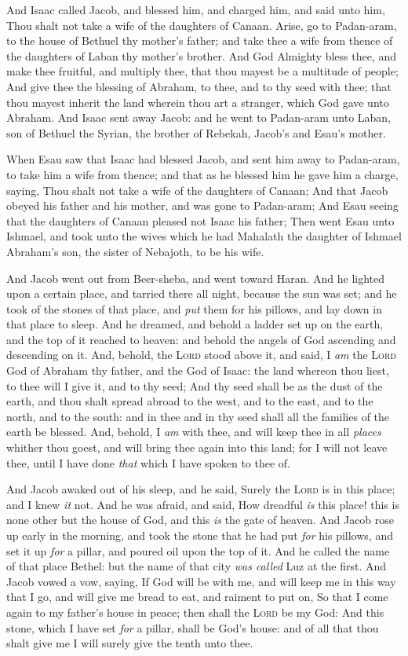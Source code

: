 \documentclass[11pt,letterpaper,oneside]{memoir}
\begin{document}
And Isaac called Jacob, and blessed him, and charged him, and said unto
him, Thou shalt not take a wife of the daughters of Canaan. Arise, go to
Padan-aram, to the house of Bethuel thy mother's father; and take thee a
wife from thence of the daughters of Laban thy mother's brother. And God
Almighty bless thee, and make thee fruitful, and multiply thee, that
thou mayest be a multitude of people; And give thee the blessing of
Abraham, to thee, and to thy seed with thee; that thou mayest inherit
the land wherein thou art a stranger, which God gave unto Abraham. And
Isaac sent away Jacob: and he went to Padan-aram unto Laban, son of
Bethuel the Syrian, the brother of Rebekah, Jacob's and Esau's mother.

When Esau saw that Isaac had blessed Jacob, and sent him away to
Padan-aram, to take him a wife from thence; and that as he blessed him
he gave him a charge, saying, Thou shalt not take a wife of the
daughters of Canaan; And that Jacob obeyed his father and his mother,
and was gone to Padan-aram; And Esau seeing that the daughters of Canaan
pleased not Isaac his father; Then went Esau unto Ishmael, and took unto
the wives which he had Mahalath the daughter of Ishmael Abraham's son,
the sister of Nebajoth, to be his wife.

And Jacob went out from Beer-sheba, and went toward Haran. And he
lighted upon a certain place, and tarried there all night, because the
sun was set; and he took of the stones of that place, and \emph{put}
them for his pillows, and lay down in that place to sleep. And he
dreamed, and behold a ladder set up on the earth, and the top of it
reached to heaven: and behold the angels of God ascending and descending
on it. And, behold, the \textsc{Lord} stood above it, and said, I
\emph{am} the \textsc{Lord} God of Abraham thy father, and the God of
Isaac: the land whereon thou liest, to thee will I give it, and to thy
seed; And thy seed shall be as the dust of the earth, and thou shalt
spread abroad to the west, and to the east, and to the north, and to the
south: and in thee and in thy seed shall all the families of the earth
be blessed. And, behold, I \emph{am} with thee, and will keep thee in
all \emph{places} whither thou goest, and will bring thee again into
this land; for I will not leave thee, until I have done \emph{that}
which I have spoken to thee of.

And Jacob awaked out of his sleep, and he said, Surely the \textsc{Lord}
is in this place; and I knew \emph{it} not. And he was afraid, and said,
How dreadful \emph{is} this place! this is none other but the house of
God, and this \emph{is} the gate of heaven. And Jacob rose up early in
the morning, and took the stone that he had put \emph{for} his pillows,
and set it up \emph{for} a pillar, and poured oil upon the top of it.
And he called the name of that place Bethel: but the name of that city
\emph{was called} Luz at the first. And Jacob vowed a vow, saying, If
God will be with me, and will keep me in this way that I go, and will
give me bread to eat, and raiment to put on, So that I come again to my
father's house in peace; then shall the \textsc{Lord} be my God: And this
stone, which I have set \emph{for} a pillar, shall be God's house: and
of all that thou shalt give me I will surely give the tenth unto thee.
\end{document}
